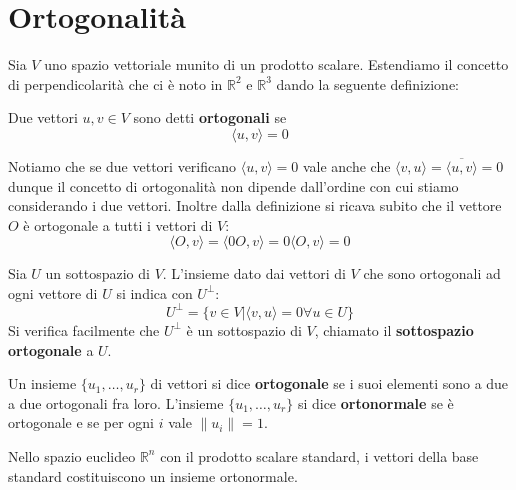 \section{Ortogonalit\`a}
Sia $V$ uno spazio vettoriale munito di un prodotto scalare. Estendiamo il
concetto di perpendicolarit\`a che ci \`e noto in $\mathbb{R}^2$ e
$\mathbb{R}^3$ dando la seguente definizione:

\begin{definition}
	Due vettori $u, v \in V$ sono detti \textbf{ortogonali} se
	\begin{equation*}
		\langle u, v \rangle = 0
	\end{equation*}
\end{definition}

Notiamo che se due vettori verificano $\langle u, v \rangle = 0$ vale anche che
$\langle v, u \rangle = \overline{\langle u, v \rangle} = 0$ dunque il concetto
di ortogonalit\`a non dipende dall'ordine con cui stiamo considerando i due
vettori. Inoltre dalla definizione si ricava subito che il vettore $O$ \`e
ortogonale a tutti i vettori di $V$:
\begin{equation*}
	\langle O, v \rangle = \langle 0O, v \rangle = 0\langle O, v \rangle = 0
\end{equation*}

\begin{definition}
	Sia $U$ un sottospazio di $V$. L'insieme dato dai vettori di $V$ che sono
	ortogonali ad ogni vettore di $U$ si indica con $U^{\perp}$:
	\begin{equation*}
		U^{\perp} = \{v \in V | \langle v, u \rangle = 0 \forall u \in U\}
	\end{equation*}
	Si verifica facilmente che $U^{\perp}$ \`e un sottospazio di $V$, chiamato
	il \textbf{sottospazio ortogonale} a $U$.
\end{definition}

\begin{definition}
	Un insieme $\{u_1, \dots, u_r\}$ di vettori si dice \textbf{ortogonale} se
	i suoi elementi sono a due a due ortogonali fra loro. L'insieme
	$\{u_1, \dots, u_r\}$ si dice \textbf{ortonormale} se \`e ortogonale e se
	per ogni $i$ vale $\| u_i \| = 1$.
\end{definition}

\begin{example}
	Nello spazio euclideo $\mathbb{R}^n$ con il prodotto scalare standard,
	i vettori della base standard costituiscono un insieme ortonormale.
\end{example}

